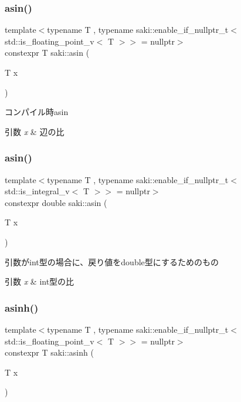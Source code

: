 \subsubsection{\texorpdfstring{asin()}{asin()}\hspace{0.1cm}{\footnotesize\ttfamily [1/2]}}
{\footnotesize\ttfamily template$<$typename T , typename saki\+::enable\+\_\+if\+\_\+nullptr\+\_\+t$<$ std\+::is\+\_\+floating\+\_\+point\+\_\+v$<$ T $>$$>$  = nullptr$>$ \\
constexpr T saki\+::asin (\begin{DoxyParamCaption}\item[{T}]{x }\end{DoxyParamCaption})}



コンパイル時asin 


\begin{DoxyParams}{引数}
{\em x} & 辺の比 \\
\hline
\end{DoxyParams}
\mbox{\label{namespacesaki_aac285debedd1f53761a838c0e4f57af0}} 
\subsubsection{\texorpdfstring{asin()}{asin()}\hspace{0.1cm}{\footnotesize\ttfamily [2/2]}}
{\footnotesize\ttfamily template$<$typename T , typename saki\+::enable\+\_\+if\+\_\+nullptr\+\_\+t$<$ std\+::is\+\_\+integral\+\_\+v$<$ T $>$$>$  = nullptr$>$ \\
constexpr double saki\+::asin (\begin{DoxyParamCaption}\item[{T}]{x }\end{DoxyParamCaption})}



引数がint型の場合に、戻り値をdouble型にするためのもの 


\begin{DoxyParams}{引数}
{\em x} & int型の比 \\
\hline
\end{DoxyParams}
\mbox{\label{namespacesaki_ab097a2d600f313b6bdd3099e61a10b9e}} 
\subsubsection{\texorpdfstring{asinh()}{asinh()}\hspace{0.1cm}{\footnotesize\ttfamily [1/2]}}
{\footnotesize\ttfamily template$<$typename T , typename saki\+::enable\+\_\+if\+\_\+nullptr\+\_\+t$<$ std\+::is\+\_\+floating\+\_\+point\+\_\+v$<$ T $>$$>$  = nullptr$>$ \\
constexpr T saki\+::asinh (\begin{DoxyParamCaption}\item[{T}]{x }\end{DoxyParamCaption})}



